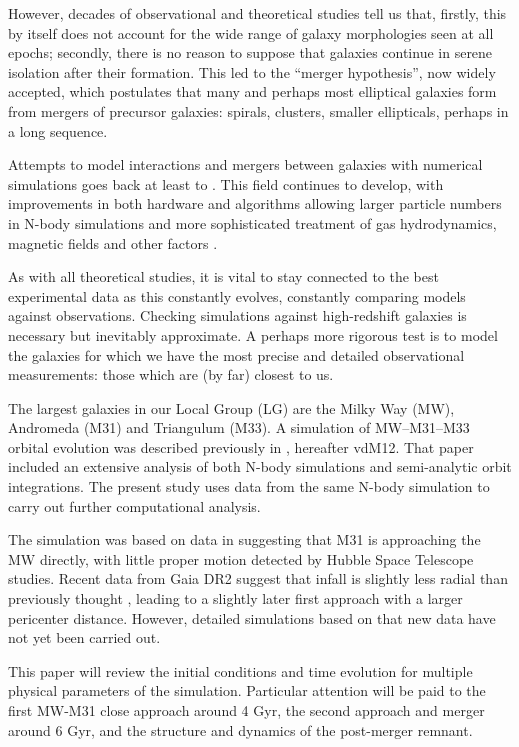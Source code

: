 \documentclass[twocolumn]{aastex63}
\begin{document}
However, decades of observational and theoretical studies tell us that, firstly, this by itself does not account for the wide range of galaxy morphologies seen at all epochs; secondly, there is no reason to suppose that galaxies continue in serene isolation after their formation. This led to the ``merger hypothesis'', now widely accepted, which postulates that many and perhaps most elliptical galaxies form from mergers of precursor galaxies: spirals, clusters, smaller ellipticals, perhaps in a long sequence.

Attempts to model interactions and mergers between galaxies with numerical simulations goes back at least to \citet{toomre_galactic_1972}.  This field continues to develop, with improvements in both hardware and algorithms allowing larger particle numbers in N-body simulations and more sophisticated treatment of gas hydrodynamics, magnetic fields and other factors \citep{bodenheimer_numerical_2007}.

As with all theoretical studies, it is vital to stay connected to the best experimental data as this constantly evolves, constantly comparing models against observations. Checking simulations against high-redshift galaxies is necessary but inevitably approximate. A perhaps more rigorous test is to model the galaxies for which we have the most precise and detailed observational measurements: those which are (by far) closest to us. 

The largest galaxies in our Local Group (LG) are the Milky Way (MW), Andromeda (M31) and Triangulum (M33).  A simulation of MW--M31--M33 orbital evolution was described previously in \citet{marel_m31_2012}, hereafter vdM12. That paper included an extensive analysis of both N-body simulations and semi-analytic orbit integrations. The present study uses data from the same N-body simulation to carry out further computational analysis.

The simulation was based on data in \citet{marel_m31_2012-1} suggesting that M31 is approaching the MW directly, with little proper motion detected by Hubble Space Telescope studies. Recent data from Gaia DR2 \citep{brown_gaia_2018} suggest that infall is slightly less radial than previously thought \citep{marel_first_2019}, leading to a slightly later first approach with a larger pericenter distance. However, detailed simulations based on that new data have not yet been carried out.

This paper will review the initial conditions and time evolution for multiple physical parameters of the simulation. Particular attention will be paid to the first MW-M31 close approach around 4 Gyr, the second approach and merger around 6 Gyr, and the structure and dynamics of the post-merger remnant.
\end{document}
